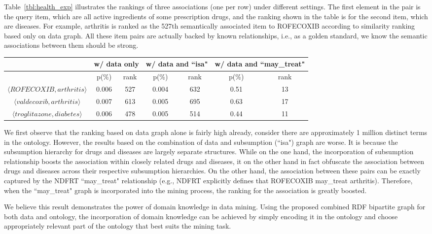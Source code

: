 Table~\ref{tbl:health_exp} illustrates the rankings of three associations (one per row) under different settings. The first element in the pair is the query item, which are all active ingredients of some prescription drugs, and the ranking shown in the table is for the second item, which are diseases. For example, arthritis is ranked as the 527th semantically associated item to ROFECOXIB according to similarity ranking based only on data graph. All these item pairs are actually backed by known relationships, i.e., as a golden standard, we know the semantic associations between them should be strong.


\begin{table*}[tbh]\scriptsize
\begin{center}
\begin{tabular}{ c || c  c || c  c || c  c }
\hline
        &   \multicolumn{2}{c||}{w/ data only}  &   \multicolumn{2}{c||}{w/ data and ``isa"} & \multicolumn{2}{c}{w/ data and ``may\_treat"}\\
\hline
                        	&   p(\%)   &   rank    &   p(\%)    &   rank    &   p(\%)    &    rank    \\
\hline
$\langle ROFECOXIB, arthritis\rangle$  &   0.006   &   527     &   0.004    &   632     &   0.51     &     13     \\
$\langle valdecoxib, arthritis\rangle$  &   0.007   &   613     &   0.005    &   695     &   0.63     &     17     \\
$\langle troglitazone, diabetes\rangle$  &   0.006   &   478     &   0.005    &   514     &   0.44     &     11     \\
\hline
\end{tabular}
\end{center}
\caption{\label{tbl:health_exp}Rankings of three semantic associations in health data under different settings.}
\end{table*}

We first observe that the ranking based on data graph alone is fairly high already, consider there are approximately 1 million distinct terms in the ontology. However, the results based on the combination of data and subsumption (``isa") graph are worse. It is because the subsumption hierarchy for drugs and diseases are largely separate structures. While on the one hand, the incorporation of subsumption relationship boosts the association within closely related drugs and diseases, it on the other hand in fact obfuscate the association between drugs and diseases across their respective subsumption hierarchies. On the other hand, the association between these pairs can be exactly captured by the NDFRT ``may\_treat" relationship (e.g., NDFRT explicitly defines that ROFECOXIB may\_treat arthritis). Therefore, when the ``may\_treat" graph is incorporated into the mining process, the ranking for the association is greatly boosted.

We believe this result demonstrates the power of domain knowledge in data mining. Using the proposed combined RDF bipartite graph for both data and ontology, the incorporation of domain knowledge can be achieved by simply encoding it in the ontology and choose appropriately relevant part of the ontology that best suits the mining task. 